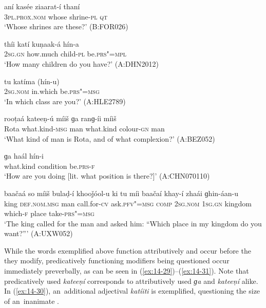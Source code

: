 \begin{exe}
\ex
\label{ex:14-23}
\gll aní kasée ziaarat-í thaní \\
\textsc{3pl.prox.nom} whose shrine-\textsc{pl} \textsc{qt} \\
\glt `Whose shrines are these?' (B:FOR026)

\ex
\label{ex:14-24}
\gll thíi katí kuṇaak-á hín-a \\
\textsc{2sg.gn} how.much child-\textsc{pl} be.\textsc{prs"=mpl} \\
\glt `How many children do you have?' (A:DHN2012)

\ex
\label{ex:14-25}
\gll tu katíma (hín-u) \\
\textsc{2sg.nom} in.which be.\textsc{prs"=msg} \\
\glt `In which class are you?' (A:HLE2789)

\ex
\label{ex:14-26}
\gll rooṭaá kateeṇ-ú míiš ɡa ranɡ-íi  míiš \\
Rota what.kind-\textsc{msg} man what.kind colour-\textsc{gn} man  \\
\glt `What kind of man is Rota, and of what complexion?' (A:BEZ052)

\ex
\label{ex:14-27}
\gll ɡa haál hín-i \\
what.kind condition be.\textsc{prs-f} \\
\glt `How are you doing [lit. what position is there?]' (A:CHN070110)

\ex
\label{ex:14-28}
\gll baačaá so míiš bulaḍ-í khooǰóol-u  ki tu míi baačaí khay-í zhaái ɡhin-áan-u \\
king \textsc{def.nom.msg} man call.for-\textsc{cv} ask.\textsc{pfv"=msg} \textsc{comp} \textsc{2sg.nom} \textsc{1sg.gn} kingdom which-\textsc{f} place take-\textsc{prs"=msg}  \\
\glt `The king called for the man and asked him: ``Which place in my kingdom do you want?''' (A:UXW052)
\end{exe}

While the  words exemplified above function attributively and occur before the  they modify, predicatively functioning modifiers being questioned occur immediately preverbally, as can be seen in (\ref{ex:14-29})--(\ref{ex:14-31}). Note that predicatively used \textit{kateeṇí} corresponds to attributively used \textit{ɡa} and \textit{kateeṇí} alike. In (\ref{ex:14-30}), an~additional adjectival  \textit{katíiti} is exemplified, questioning the size of an~inanimate .


